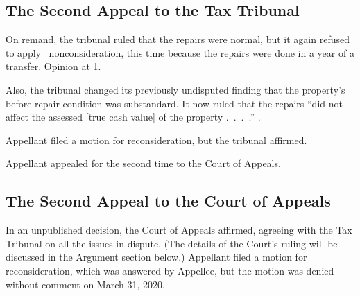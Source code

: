 \documentclass[12pt,\documentclassflag]{michiganCourtOfAppealsBrief}
\begin{document}



\subsection{The Second Appeal to the Tax Tribunal}

On remand, the tribunal ruled that the repairs were normal, but it again refused to apply \mathieuGast\ nonconsideration, this time because
the repairs were done in a year of a transfer. Opinion at 1.

Also, the tribunal changed its previously undisputed finding that the property's before-repair condition was substandard. It now ruled that the repairs ``did not affect the assessed [true cash value] of the property .~.~.~.'' \Id. 

Appellant filed a motion for reconsideration, but the tribunal affirmed.

Appellant appealed for the second time to the Court of Appeals.

\subsection{The Second Appeal to the Court of Appeals}

In an unpublished decision, the Court of Appeals affirmed, agreeing with the Tax Tribunal on all the issues in dispute. (The details of the Court's ruling will be discussed in the Argument section below.) Appellant filed a motion for reconsideration, which was answered by Appellee, but the motion was denied without comment on March 31, 2020.
\end{document}
